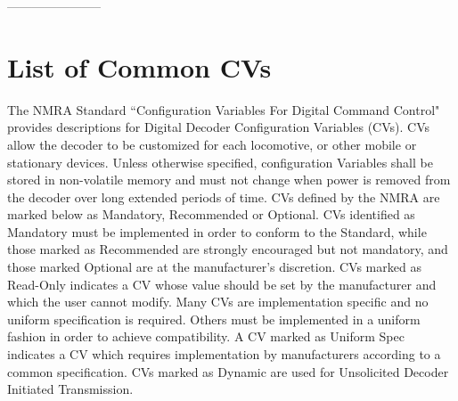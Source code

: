 -----------------------

\section{List of Common CVs}

The NMRA Standard ``Configuration Variables For Digital Command Control" provides descriptions for Digital Decoder Configuration Variables (CVs). CVs allow the decoder to be customized for each locomotive, or other mobile or stationary devices. Unless otherwise specified, configuration Variables shall be stored in non-volatile memory and must not change when power is removed from the decoder over long extended periods of time. CVs defined by the NMRA are marked below as Mandatory, Recommended or Optional. CVs identified as Mandatory must be implemented in order to conform to the Standard, while those marked as Recommended are strongly encouraged but not mandatory, and those marked Optional are at the manufacturer’s discretion. CVs marked as Read-Only indicates a CV whose value should be set by the manufacturer and which the user cannot modify. Many CVs are implementation specific and no uniform specification is required. Others must be implemented in a uniform fashion in order to achieve compatibility. A CV marked as Uniform Spec indicates a CV which requires implementation by manufacturers according to a common specification. CVs marked as Dynamic are used for Unsolicited Decoder Initiated Transmission. 

\scriptsize

